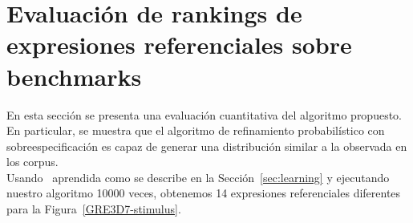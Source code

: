 \chapter{Evaluaci\'on de rankings de expresiones referenciales sobre benchmarks}
\label{sec:evaluacion}

En esta secci\'on se presenta una evaluaci\'on cuantitativa del algoritmo propuesto.
En particular, se muestra que el algoritmo de refinamiento probabil\'{i}stico con sobreespecificaci\'on es capaz de generar una distribuci\'on similar a la observada en los corpus.\\


Usando \puse\ aprendida como se describe en la Secci\'on~\ref{sec:learning} y ejecutando
nuestro algoritmo 10000 veces, obtenemos 14 expresiones referenciales diferentes
para la Figura~\ref{GRE3D7-stimulus}.

